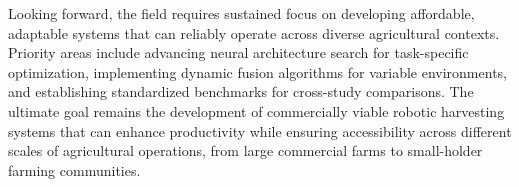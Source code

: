 \documentclass{ieeeaccess}
\begin{document}
Looking forward, the field requires sustained focus on developing affordable, adaptable systems that can reliably operate across diverse agricultural contexts. Priority areas include advancing neural architecture search for task-specific optimization, implementing dynamic fusion algorithms for variable environments, and establishing standardized benchmarks for cross-study comparisons. The ultimate goal remains the development of commercially viable robotic harvesting systems that can enhance productivity while ensuring accessibility across different scales of agricultural operations, from large commercial farms to small-holder farming communities. 






\end{document}
